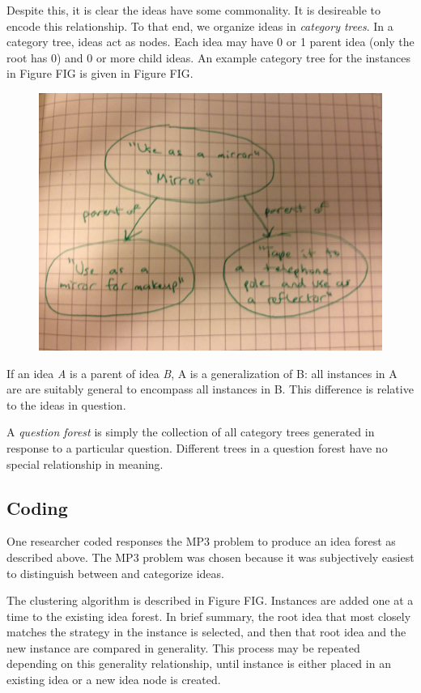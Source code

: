 Despite this, it is clear the ideas have some commonality. It is desireable to encode this relationship. To that end, we organize ideas in \emph{category trees}. In a category tree, ideas act as nodes. Each idea may have 0 or 1 parent idea (only the root has 0) and 0 or more child ideas. An example category tree for the instances in Figure FIG is given in Figure FIG.

\begin{figure}[!h]
    \centering
    \includegraphics[width=0.9\columnwidth]{sample_category_tree}
\end{figure}

If an idea \emph{A} is a parent of idea \emph{B}, A is a generalization of B: all instances in A are are suitably general to encompass all instances in B. This difference is relative to the ideas in question.

A \emph{question forest} is simply the collection of all category trees generated in response to a particular question. Different trees in a question forest have no special relationship in meaning.

\subsection{Coding}

One researcher coded responses the MP3 problem to produce an idea forest as described above. The MP3 problem was chosen because it was subjectively easiest to distinguish between and categorize ideas.

The clustering algorithm is described in Figure FIG. Instances are added one at a time to the existing idea forest. In brief summary, the root idea that most closely matches the strategy in the instance is selected, and then that root idea and the new instance are compared in generality. This process may be repeated depending on this generality relationship, until instance is either placed in an existing idea or a new idea node is created.

